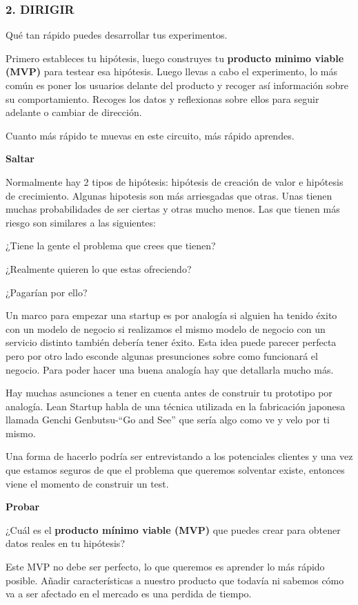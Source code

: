 \documentclass[12pt,twoside,titlepage]{report}
\begin{document}
\subsubsection{2. DIRIGIR}

Qué tan rápido puedes desarrollar tus experimentos.

Primero estableces tu hipótesis, luego construyes tu \textbf{producto minimo viable (MVP)} para testear esa hipótesis. Luego llevas a cabo el experimento, lo más común es poner los usuarios delante del producto y recoger así información sobre su comportamiento. Recoges los datos y reflexionas sobre ellos para seguir adelante o cambiar de dirección. 

Cuanto más rápido te muevas en este circuito, más rápido aprendes.

\textbf{Saltar}

Normalmente hay 2 tipos de hipótesis: hipótesis de creación de valor e hipótesis de crecimiento. Algunas hipotesis son más arriesgadas que otras. Unas tienen muchas probabilidades de ser ciertas y otras mucho menos. Las que tienen más riesgo son similares a las siguientes: 

¿Tiene la gente el problema que crees que tienen?

¿Realmente quieren lo que estas ofreciendo?

¿Pagarían por ello?

Un marco para empezar una startup es por analogía si alguien ha tenido éxito con un modelo de negocio si realizamos el mismo modelo de negocio con un servicio distinto también debería tener éxito. Esta idea puede parecer perfecta pero por otro lado esconde algunas presunciones sobre como funcionará el negocio. Para poder hacer una buena analogía hay que detallarla mucho más.

Hay muchas asunciones a tener en cuenta antes de construir tu prototipo por analogía. Lean Startup habla de una técnica utilizada en la fabricación japonesa llamada Genchi Genbutsu-“Go and See” que sería algo como ve y velo por ti mismo. 

Una forma de hacerlo podría ser entrevistando a los potenciales clientes y una vez que estamos seguros de que el problema que queremos solventar existe, entonces viene el momento de construir un test.

\textbf{Probar}

¿Cuál es el \textbf{producto mínimo viable (MVP)} que puedes crear para obtener datos reales en tu hipótesis?

Este MVP no debe ser perfecto, lo que queremos es aprender lo más rápido posible. Añadir características a nuestro producto que todavía ni sabemos cómo va a ser afectado en el mercado es una perdida de tiempo.
\end{document}
